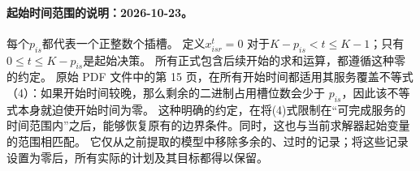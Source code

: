 \documentclass{article}
\begin{document}
\paragraph{起始时间范围的说明：2026-10-23。}
每个$p_{is}$都代表一个正整数个插槽。 定义$x_{isr}^t=0$
对于$K-p_{is}<t\le K-1$；只有$0\le t\le K-p_{is}$是起始决策。
所有正式包含后续开始的求和运算，都遵循这种零的约定。
原始 PDF 文件中的第 15 页，在所有开始时间都适用其服务覆盖不等式（4）：如果开始时间较晚，那么剩余的二进制占用槽位数会少于 $p_{is}$，因此该不等式本身就迫使开始时间为零。
这种明确的约定，在将(4)式限制在“可完成服务的时间范围内”之后，能够恢复原有的边界条件。同时，这也与当前求解器起始变量的范围相匹配。
它仅从之前提取的模型中移除多余的、过时的记录；将这些记录设置为零后，所有实际的计划及其目标都得以保留。
\end{document}
